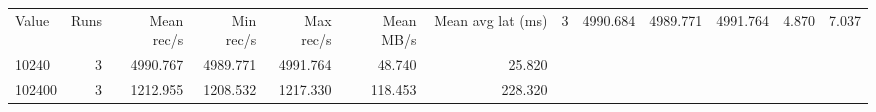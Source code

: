 \begin{tabular}{lrrrrrr}
\hline
Value & Runs & Mean rec/s & Min rec/s & Max rec/s & Mean MB/s & Mean avg lat (ms) \
 & 3 & 4990.684 & 4989.771 & 4991.764 & 4.870 & 7.037 \\
10240 & 3 & 4990.767 & 4989.771 & 4991.764 & 48.740 & 25.820 \\
102400 & 3 & 1212.955 & 1208.532 & 1217.330 & 118.453 & 228.320 \\
\hline
\end{tabular}
